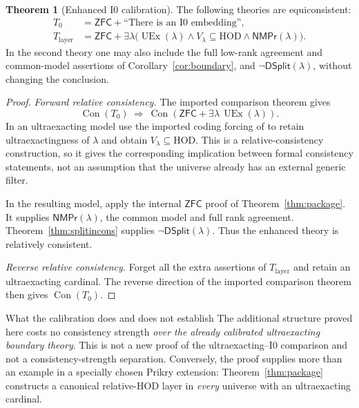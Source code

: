 \documentclass[11pt,letterpaper]{article}
\theoremstyle{definition}
\newtheorem{theorem}[definition]{Theorem}
\numberwithin{equation}{section}
\newcommand{\ZFC}{\mathsf{ZFC}}
\newcommand{\HOD}{\mathrm{HOD}}
\newcommand{\UEx}{\operatorname{UEx}}
\newcommand{\Con}{\operatorname{Con}}
\newcommand{\Izero}{\mathrm{I0}}
\newcommand{\NS}{\mathsf{DSplit}}
\newcommand{\NMPr}{\mathsf{NMPr}}
\begin{document}
\begin{theorem}[Enhanced $\Izero$ calibration]\label{thm:equicons}
The following theories are equiconsistent:
\begin{align*}
 T_0&=\ZFC+\text{``There is an $\Izero$ embedding''},\\
 T_{\mathrm{layer}}
   &=\ZFC+\exists\lambda\bigl(\UEx(\lambda)
       \wedge V_\lambda\subseteq\HOD\wedge\NMPr(\lambda)\bigr).
\end{align*}
In the second theory one may also include the full low-rank agreement
and common-model assertions of Corollary~\ref{cor:boundary}, and
$\neg\NS(\lambda)$, without changing the conclusion.
\end{theorem}

\begin{proof}
\emph{Forward relative consistency.}
The imported comparison theorem gives
\[
 \Con(T_0)\ \Longrightarrow\
 \Con(\ZFC+\exists\lambda\,\UEx(\lambda)).
\]
In an ultraexacting model use the imported coding forcing of
\cite[Proposition~3.9]{abgl} to retain ultraexactingness of $\lambda$
and obtain $V_\lambda\subseteq\HOD$. This is a relative-consistency
construction, so it gives the corresponding implication between
formal consistency statements, not an assumption that the universe
already has an external generic filter.

In the resulting model, apply the internal $\ZFC$ proof of
Theorem~\ref{thm:package}. It supplies $\NMPr(\lambda)$, the common
model and full rank agreement. Theorem~\ref{thm:splitincons} supplies
$\neg\NS(\lambda)$. Thus the enhanced theory is relatively consistent.

\emph{Reverse relative consistency.}
Forget all the extra assertions of $T_{\mathrm{layer}}$ and retain an
ultraexacting cardinal. The reverse direction of the imported
comparison theorem then gives $\Con(T_0)$.
\end{proof}

\begin{assessment}{What the calibration does and does not establish}
The additional structure proved here costs no consistency strength
\emph{over the already calibrated ultraexacting boundary theory}.
This is not a new proof of the ultraexacting--$\Izero$ comparison and
not a consistency-strength separation. Conversely, the proof supplies
more than an example in a specially chosen Prikry extension:
Theorem~\ref{thm:package} constructs a canonical relative-HOD layer in
\emph{every} universe with an ultraexacting cardinal.
\end{assessment}
\end{document}
